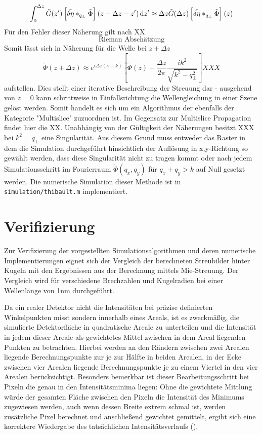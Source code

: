 \begin{equation}
\int_{0}^{\Delta z} \tilde{G}(z')\left[\tilde{\delta\eta}\ast_{q_\perp} \tilde{\Phi}\right](z+\Delta z-z')\dif z'
\approx
\Delta z \tilde{G}(\Delta z)\left[\tilde{\delta\eta}\ast_{q_\perp} \tilde{\Phi}\right](z)
\end{equation}
Für den Fehler dieser Näherung gilt nach XX
\begin{equation}
\text{Rieman Abschätzung}
\end{equation}
Somit lässt sich in Näherung für die Welle bei $z+\Delta z$
\begin{equation}
\tilde{\Phi}(z+\Delta z)
\approx
e^{i\Delta z(\kappa-k)}
\left[
\tilde{\Phi}(z)+\frac{\Delta z}{2\pi}\frac{ik^2}{\sqrt{k^2-q^2_\perp}}
\right] XXX
\end{equation}
aufstellen. Dies stellt einer iterative Beschreibung der Streuung dar - ausgehend von $z=0$ kann schrittweise in Einfallsrichtung die Wellengleichung in einer Szene gelöst werden. Somit handelt es sich um ein Algorithmus der ebenfalls der Kategorie "Multislice" zuzuordnen ist. Im Gegensatz zur Multislice Propagation findet hier die XX. Unabhängig von der Gültigkeit der Näherungen besitzt XXX bei $k^2=q_\perp$ eine Singularität. Aus diesem Grund muss entweder das Raster in dem die Simulation durchgeführt hinsichtlich der Auflösung in x,y-Richtung so gewählt werden, dass diese Singularität nicht zu tragen kommt oder nach jedem Simulationsschritt im Fourierraum $\tilde{\Phi}(q_x,q_y)$ für $q_x+q_y>k$ auf Null gesetzt werden.
Die numerische Simulation dieser Methode ist in \texttt{simulation/thibault.m} implementiert.


\section{Verifizierung}
Zur Verifizierung der vorgestellten Simulationsalgorithmen und deren numerische Implementierungen eignet sich der Vergleich der berechneten Streubilder hinter Kugeln mit den Ergebnissen aus der Berechnung mittels Mie-Streuung. Der Vergleich wird für verschiedene Brechzahlen und Kugelradien bei einer Wellenlänge von 1\si{nm} durchgeführt.

Da ein realer Detektor nicht die Intensitäten bei präzise definierten Winkelpunkten misst sondern innerhalb eines Areals, ist es zweckmäßig, die simulierte Detektorfläche in quadratische Areale zu unterteilen und die Intensität in jedem dieser Areale als gewichtetes Mittel zwischen in dem Areal liegenden Punkten zu betrachten.
Hierbei werden an den Rändern zwischen zwei Arealen liegende Berechnungspunkte zur je zur Hälfte in beiden Arealen, in der Ecke zwischen vier Arealen liegende Berechnungspunkte je zu einem Viertel in den vier Arealen berücksichtigt.
Besonders bemerkbar ist dieser Bearbeitungsschritt bei Pixeln die genau in den Intensitätsminima liegen: Ohne die gewichtete Mittlung würde der gesamten Fläche zwischen den Pixeln die Intensität des Minimums zugewiesen werden, auch wenn dessen Breite extrem schmal ist, werden zusätzliche Pixel berechnet und anschließend gewichtet gemittelt, ergibt sich eine korrektere Wiedergabe des tatsächlichen Intensitätsverlaufs ().

